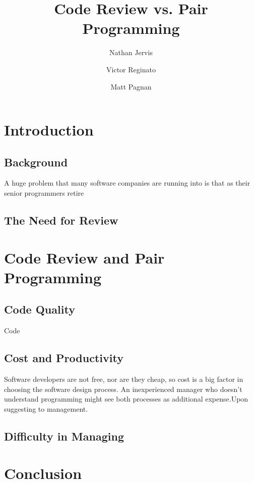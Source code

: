 \documentclass{article}
\title{Code Review vs. Pair Programming}
\author{Nathan Jervis \and Victor Reginato \and Matt Pagnan}
\begin{document}
\maketitle

\section{Introduction}

\subsection{Background}
A huge problem that many software companies are running into is that as their senior programmers retire  

\subsection{The Need for Review}

\section{Code Review and Pair Programming}

\subsection{Code Quality}

Code

\subsection{Cost and Productivity}

Software developers are not free, nor are they cheap, so cost is a big factor in choosing the software design process. An inexperienced manager who doesn't understand programming might see both processes as additional expense.Upon suggesting \PP to management.

\subsection{Difficulty in Managing}

\section{Conclusion}
\end{document}
